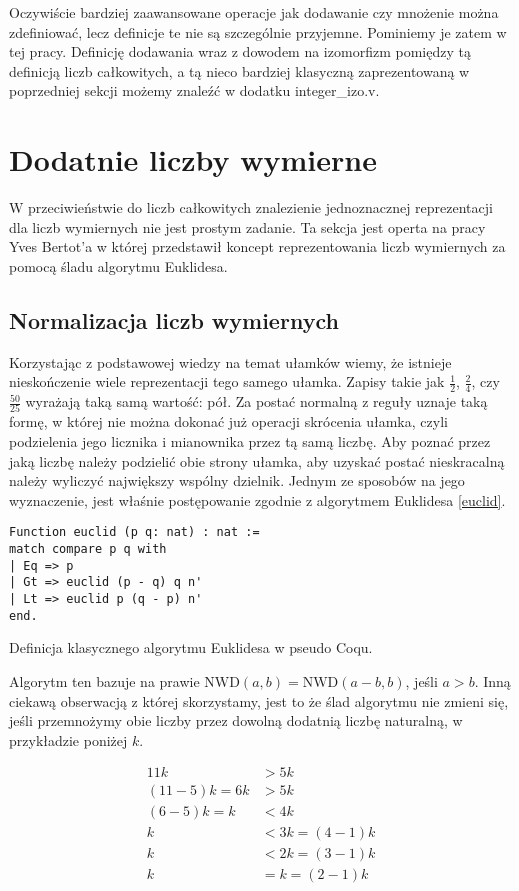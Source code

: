 Oczywiście bardziej zaawansowane operacje jak dodawanie czy mnożenie można zdefiniować, lecz definicje te nie są szczególnie przyjemne. Pominiemy je zatem w tej pracy. Definicję dodawania wraz z dowodem na izomorfizm pomiędzy tą definicją liczb całkowitych, a tą nieco bardziej klasyczną zaprezentowaną w poprzedniej sekcji możemy znaleźć w dodatku integer\_izo.v.
\section{Dodatnie liczby wymierne}
W przeciwieństwie do liczb całkowitych znalezienie jednoznacznej reprezentacji dla liczb wymiernych nie jest prostym zadanie. Ta sekcja jest operta na pracy Yves Bertot'a \cite{Qplus} w której przedstawił koncept reprezentowania liczb wymiernych za pomocą śladu algorytmu Euklidesa.
\subsection{Normalizacja liczb wymiernych}
Korzystając z podstawowej wiedzy na temat ułamków wiemy, że istnieje nieskończenie wiele reprezentacji tego samego ułamka. Zapisy takie jak $\frac{1}{2}$, $\frac{2}{4}$, czy $\frac{50}{25}$ wyrażają taką samą wartość: pół. Za postać normalną z reguły uznaje taką formę, w której nie można dokonać już operacji skrócenia ułamka, czyli podzielenia jego licznika i mianownika przez tą samą liczbę. Aby poznać przez jaką liczbę należy podzielić obie strony ułamka, aby uzyskać postać nieskracalną należy wyliczyć największy wspólny dzielnik. Jednym ze sposobów na jego wyznaczenie, jest właśnie postępowanie zgodnie z algorytmem Euklidesa \ref{euclid}. 
\begin{code}
\begin{verbatim}
Function euclid (p q: nat) : nat :=
match compare p q with
| Eq => p
| Gt => euclid (p - q) q n'
| Lt => euclid p (q - p) n'
end.
\end{verbatim}
\caption{Definicja klasycznego algorytmu Euklidesa w pseudo Coqu.}
\label{euclid}
\end{code}
Algorytm ten bazuje na prawie $\textrm{NWD}(a, b) = \textrm{NWD}(a - b, b)$, jeśli $a > b$. Inną ciekawą obserwacją z której skorzystamy, jest to że ślad algorytmu nie zmieni się, jeśli przemnożymy obie liczby przez dowolną dodatnią liczbę naturalną, w przykładzie poniżej $k$.

\begin{equation}
    \begin{split}
        11k&>5k\\
        (11-5)k=6k&>5k\\
        (6-5)k=k&<4k\\
        k&<3k=(4-1)k\\
        k&<2k=(3-1)k\\
        k&=k=(2-1)k
    \end{split}
\end{equation}

